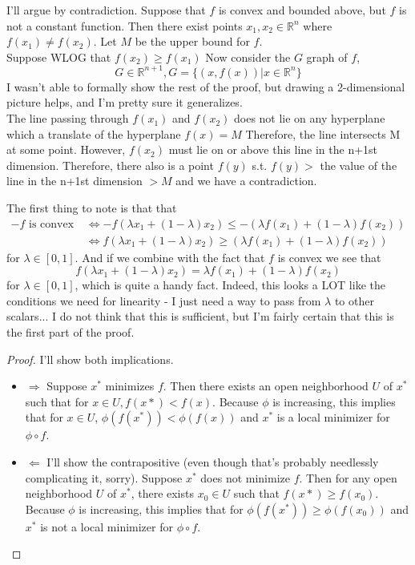 \documentclass[12pt]{article}
\newenvironment{problem}[2][Problem]{\begin{trivlist}
\item[\hskip \labelsep {\bfseries #1}\hskip \labelsep {\bfseries #2.}]}{\end{trivlist}}
\theoremstyle{definition}
\theoremstyle{definition}
\theoremstyle{definition}
\theoremstyle{definition}
\begin{document}
\begin{problem}{7.13}
I'll argue by contradiction. Suppose that $f$ is convex and bounded above, but $f$ is not a constant function. Then there exist points $x_1, x_2 \in \mathbb{R}^n$ where $f(x_1) \neq f(x_2)$. Let $M$ be the upper bound for $f$. \\ 
Suppose WLOG that $f(x_2) \geq f(x_1)$ Now consider the $G$ graph of $f$, 
$$G \in \mathbb{R}^{n+1}, G = \{ (x, f(x)) | x \in \mathbb{R}^n \}$$
I wasn't able to formally show the rest of the proof, but drawing a 2-dimensional picture helps, and I'm pretty sure it generalizes. \\
The line passing through $f(x_1)$ and $f(x_2)$ does not lie on any hyperplane which a translate of the hyperplane $f(x) = M$ Therefore, the line intersects M at some point. However, $f( x_2 )$ must lie on or above this line in the n+1st dimension. Therefore, there also is a point $f(y)$ s.t. $f(y) > $ the value of the line in the n+1st dimension $> M$ and we have a contradiction.
\end{problem}

\begin{problem}{7.20}
The first thing to note is that that 
\begin{align*}
-f \text{ is convex } &\iff -f(\lambda x_ 1 + (1- \lambda)x_2) \leq -(\lambda f(x_1) + (1 - \lambda) f(x_2)) \\ 
&\iff f(\lambda x_ 1 + (1- \lambda)x_2) \geq (\lambda f(x_1) + (1 - \lambda) f(x_2))
\end{align*}
for $\lambda \in [0,1]$. And if we combine with the fact that $f$ is convex we see that
$$
f(\lambda x_ 1 + (1- \lambda)x_2) = \lambda f(x_1) + (1 - \lambda) f(x_2)
$$
for $\lambda \in [0,1]$, which is quite a handy fact.
Indeed, this looks a LOT like the conditions we need for linearity - I just need a way to pass from $\lambda$ to other scalars... I do not think that this is sufficient, but I'm fairly certain that this is the first part of the proof.
\end{problem}

\begin{problem}{7.21}\begin{proof} I'll show both implications.
\begin{itemize}
\item $\Rightarrow$
Suppose $x^*$ minimizes $f$. Then there exists an open neighborhood $U$ of $x^*$ such that for $x \in U ,f(x*) < f(x)$. Because $\phi$ is increasing, this implies that for $x \in U$, $\phi(f(x^*)) < \phi(f(x))$ and $x^*$ is a local minimizer for $\phi \circ f$. 
\item $\Leftarrow$ I'll show the contrapositive (even though that's probably needlessly complicating it, sorry). Suppose $x^*$ does not minimize $f$. Then for any open neighborhood $U$ of $x^*$, there exists $x_0 \in U$ such that  $f(x*) \geq f(x_0)$. Because $\phi$ is increasing, this implies that for $\phi(f(x^*)) \geq \phi(f(x_0))$ and $x^*$ is not a local minimizer for $\phi \circ f$.
\end{itemize}
\end{proof}
\end{problem}
\end{document}
